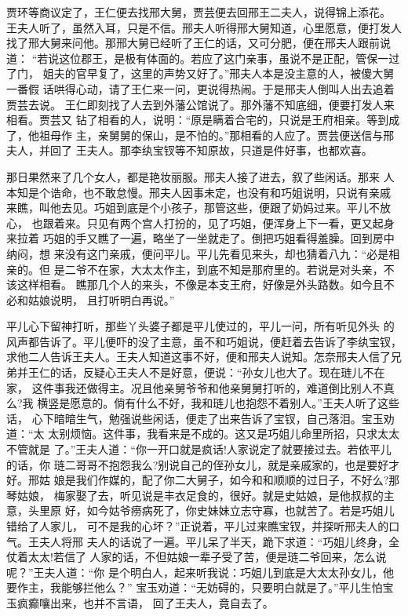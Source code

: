 贾环等商议定了，王仁便去找邢大舅，贾芸便去回邢王二夫人，说得锦上添花。
王夫人听了，虽然入耳，只是不信。邢夫人听得邢大舅知道，心里愿意，便打发人
找了邢大舅来问他。那邢大舅已经听了王仁的话，又可分肥，便在邢夫人跟前说道：
“若说这位郡王，是极有体面的。若应了这门亲事，虽说不是正配，管保一过了门，
姐夫的官早复了，这里的声势又好了。”邢夫人本是没主意的人，被傻大舅一番假
话哄得心动，请了王仁来一问，更说得热闹。于是邢夫人倒叫人出去追着贾芸去说。
王仁即刻找了人去到外藩公馆说了。那外藩不知底细，便要打发人来相看。贾芸又
钻了相看的人，说明：“原是瞒着合宅的，只说是王府相亲。等到成了，他祖母作
主，亲舅舅的保山，是不怕的。”那相看的人应了。贾芸便送信与邢夫人，并回了
王夫人。那李纨宝钗等不知原故，只道是件好事，也都欢喜。

那日果然来了几个女人，都是艳妆丽服。邢夫人接了进去，叙了些闲话。那来
人本知是个诰命，也不敢怠慢。邢夫人因事未定，也没有和巧姐说明，只说有亲戚
来瞧，叫他去见。巧姐到底是个小孩子，那管这些，便跟了奶妈过来。平儿不放心，
也跟着来。只见有两个宫人打扮的，见了巧姐，便浑身上下一看，更又起身来拉着
巧姐的手又瞧了一遍，略坐了一坐就走了。倒把巧姐看得羞臊。回到房中纳闷，想
来没有这门亲戚，便问平儿。平儿先看见来头，却也猜着八九：“必是相亲的。但
是二爷不在家，大太太作主，到底不知是那府里的。若说是对头亲，不该这样相看。
瞧那几个人的来头，不像是本支王府，好像是外头路数。如今且不必和姑娘说明，
且打听明白再说。”

平儿心下留神打听，那些丫头婆子都是平儿使过的，平儿一问，所有听见外头
的风声都告诉了。平儿便吓的没了主意，虽不和巧姐说，便赶着去告诉了李纨宝钗，
求他二人告诉王夫人。王夫人知道这事不好，便和邢夫人说知。怎奈邢夫人信了兄
弟并王仁的话，反疑心王夫人不是好意，便说：“孙女儿也大了。现在琏儿不在家，
这件事我还做得主。况且他亲舅爷爷和他亲舅舅打听的，难道倒比别人不真么?我
横竖是愿意的。倘有什么不好，我和琏儿也抱怨不着别人。”王夫人听了这些话，
心下暗暗生气，勉强说些闲话，便走了出来告诉了宝钗，自己落泪。宝玉劝道：“太
太别烦恼。这件事，我看来是不成的。这又是巧姐儿命里所招，只求太太不管就是
了。”王夫人道：“你一开口就是疯话!人家说定了就要接过去。若依平儿的话，你
琏二哥哥不抱怨我么?别说自己的侄孙女儿，就是亲戚家的，也是要好才好。邢姑
娘是我们作媒的，配了你二大舅子，如今和和顺顺的过日子，不好么?那琴姑娘，
梅家娶了去，听见说是丰衣足食的，很好。就是史姑娘，是他叔叔的主意，头里原
好，如今姑爷痨病死了，你史妹妹立志守寡，也就苦了。若是巧姐儿错给了人家儿，
可不是我的心坏？”正说着，平儿过来瞧宝钗，并探听邢夫人的口气。王夫人将邢
夫人的话说了一遍。平儿呆了半天，跪下求道：“巧姐儿终身，全仗着太太!若信了
人家的话，不但姑娘一辈子受了苦，便是琏二爷回来，怎么说呢？”王夫人道：“你
是个明白人，起来听我说：巧姐儿到底是大太太孙女儿，他要作主，我能够拦他么？”
宝玉劝道：“无妨碍的，只要明白就是了。”平儿生怕宝玉疯癫嚷出来，也并不言语，
回了王夫人，竟自去了。

